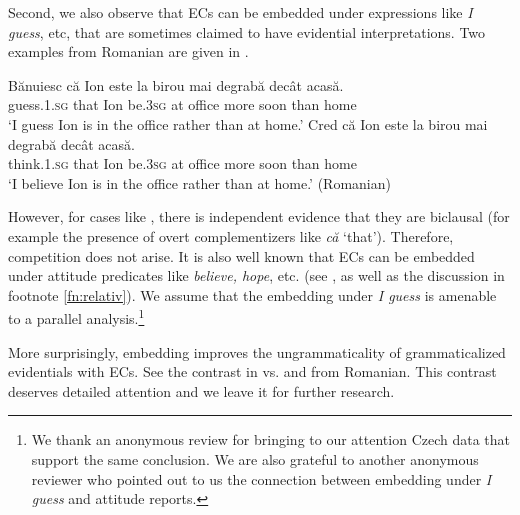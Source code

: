 \documentclass[output=paper,
]{langscibook}
\begin{document}
Second, we also observe that ECs can be embedded under expressions like \textit{I guess}, etc, that are sometimes claimed to have evidential interpretations. Two examples from Romanian are given in . 


	\ea \label{taglexevid} \ea \gll Bănuiesc că Ion este la birou mai degrabă decât acasă.\\
		guess.\textsc{1.sg} that Ion be.\textsc{3sg} at office more soon than home\\ 
		\glt `I guess Ion is in the office rather than at home.'
		\ex \gll Cred că Ion este la birou mai degrabă decât acasă.\\
		think.\textsc{1.sg} that Ion be.\textsc{3sg} at office more soon than home\\ 
		\glt `I believe Ion is in the office rather than at home.' \hfill (Romanian)
		\z \z 

However, for cases like , there is independent evidence that they are biclausal (for example the presence of overt complementizers like \textit{că} `that'). Therefore, competition does not arise. It is also well known that ECs can be embedded under attitude predicates like \textit{believe, hope}, etc. (see \citealt{herrub14}, as well as the discussion in footnote \ref{fn:relativ}). We assume that the embedding under \textit{I guess} is amenable to a parallel analysis.\footnote{We thank an anonymous review for bringing to our attention Czech data that support the same conclusion. We are also grateful to another anonymous reviewer who pointed out to us the connection between embedding under \textit{I guess} and attitude reports.
}

More surprisingly, embedding improves the ungrammaticality of grammaticalized evidentials with ECs. See the contrast in  vs.  and  from Romanian. This contrast deserves detailed attention and we leave it for further research.

	\ea \label{moremb}  \label{moremba}
		 \label{morembb}
        \z \z 
\end{document}
